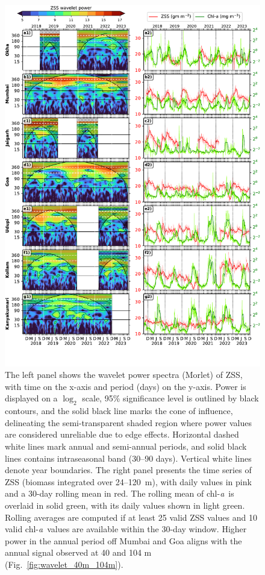 \documentclass[authoryear,review,11pt]{elsarticle}
\newcommand{\chla}{chl-{\emph{a}}}
\begin{document}
\begin{figure}[htbp]
	\centering
	\includegraphics[width=\textwidth]{./fig_07_wavelet_ss_chl_time_series.pdf} 
	\captionsetup{justification=justified,font=footnotesize,skip=0.05\baselineskip,width=\textwidth}
	\caption{The left panel shows the wavelet power spectra (Morlet) of ZSS, with time on the x-axis and period (days) on the y-axis. Power is displayed on a $\log_2$ scale, 95\% significance level is outlined by black contours, and the solid black line marks the cone of influence, delineating the semi-transparent shaded region where power values are considered unreliable due to edge effects. Horizontal dashed white lines mark annual and semi-annual periods,  and solid black lines contains intraseasonal band (30--90 days). Vertical white lines denote year boundaries. The right panel presents the time series of ZSS (biomass integrated over 24--120~m), with daily values in pink and a 30-day rolling mean in red. The rolling mean of \chla\ is overlaid in solid green, with its daily values shown in light green. Rolling averages are computed if at least 25 valid ZSS values and 10 valid \chla\ values are available within the 30-day window. Higher power in the annual period off Mumbai and Goa aligns with the annual signal observed at 40 and 104 m (Fig.~\ref{fig:wavelet_40m_104m}).}
	\label{fig:wavelet_ss_chl_time_series}
\end{figure}
\end{document}
